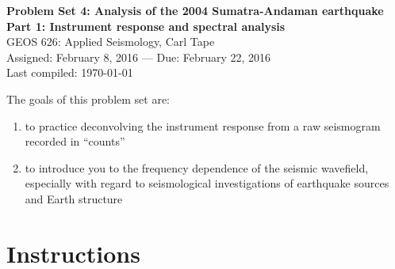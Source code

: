 \documentclass[11pt,titlepage,fleqn]{article}
\begin{document}

\begin{spacing}{1.2}
\centering
{\large \bf Problem Set 4: Analysis of the 2004 Sumatra-Andaman earthquake \\
Part 1: Instrument response and spectral analysis \\ }
GEOS 626: Applied Seismology, Carl Tape \\
Assigned: February 8, 2016 --- Due: February 22, 2016 \\
Last compiled: \today
\end{spacing}


\bigskip
\noindent
The goals of this problem set are:
%
\begin{enumerate}
\item to practice deconvolving the instrument response from a raw seismogram recorded in ``counts''
\item to introduce you to the frequency dependence of the seismic wavefield, especially with regard to seismological investigations of earthquake sources and Earth structure
\end{enumerate}

\section*{Instructions}
\end{document}
